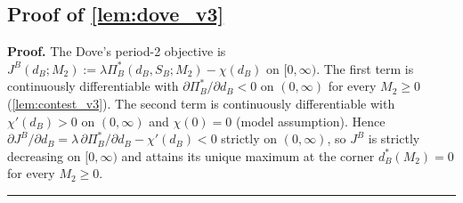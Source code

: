 \documentclass[11pt,twoside]{extarticle}
\newenvironment{proof}[1][Proof]{\noindent \textbf{#1.} }{\ \rule{0.5em}{0.5em}}
\begin{document}
\subsection*{Proof of \autoref{lem:dove_v3}} \label{app:proof:dove_v3}
\begin{proof}
The Dove's period-2 objective is $J^B(d_B;M_2):=\lambda\Pi_B^*(d_B,S_B;M_2)-\chi(d_B)$ on $[0,\infty)$. The first term is continuously differentiable with $\partial\Pi_B^*/\partial d_B<0$ on $(0,\infty)$ for every $M_2\ge 0$ (\autoref{lem:contest_v3}). The second term is continuously differentiable with $\chi'(d_B)>0$ on $(0,\infty)$ and $\chi(0)=0$ (model assumption). Hence $\partial J^B/\partial d_B=\lambda\,\partial\Pi_B^*/\partial d_B-\chi'(d_B)<0$ strictly on $(0,\infty)$, so $J^B$ is strictly decreasing on $[0,\infty)$ and attains its unique maximum at the corner $d_B^*(M_2)=0$ for every $M_2\ge 0$.
\end{proof}
\end{document}
